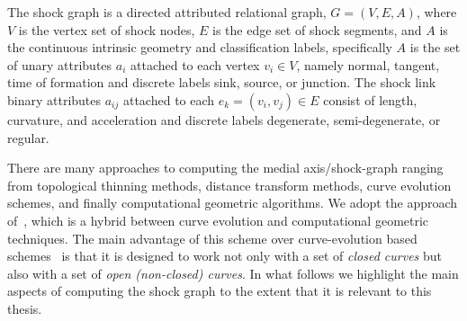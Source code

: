 \begin{definition}
\label{def:sg}
The shock graph is a directed attributed relational graph, $G=(V,E,A)$, where $V$ is the vertex set of shock nodes, $E$ is the edge set of shock segments, and $A$ is the continuous intrinsic geometry and classification labels, specifically $A$ is the set of unary attributes $a_i$ attached to each vertex $v_i \in V$, namely normal, tangent, time of formation and discrete labels sink, source, or junction. The shock link binary attributes $a_{ij}$ attached to each $e_k=(v_i,v_j) \in E$ consist of length, curvature, and acceleration and discrete labels degenerate, semi-degenerate, or regular. 
\end{definition}









There are many approaches to computing the medial axis/shock-graph ranging from topological thinning methods, distance transform methods, curve evolution schemes, and finally computational geometric algorithms.  We adopt the approach of~\cite{Tamrakar:Kimia:Shock}, which is  a hybrid between curve evolution and computational geometric techniques. The main advantage of this scheme over curve-evolution based schemes~\cite{Tek:Wave:Propagation:IJCV03} is that it is designed to work not only with a set of \emph{closed curves} but also with a set of \emph{open (non-closed) curves}. In what follows we highlight the main aspects of computing the shock graph to the extent that it is relevant to this thesis. 





